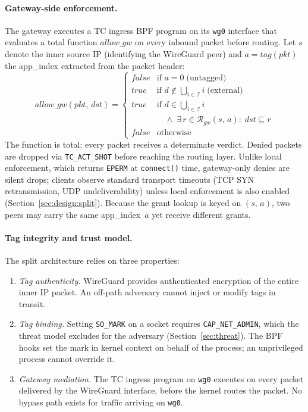 \documentclass[sigconf]{acmart}
\begin{document}
\paragraph{Gateway-side enforcement.}
The gateway executes a TC ingress BPF program on its \texttt{wg0}
interface that evaluates a total function
$\mathit{allow\_gw}$ on every inbound packet before routing.
Let $s$ denote the inner source IP (identifying the WireGuard
peer) and $a = \mathit{tag}(\mathit{pkt})$ the app\_index
extracted from the packet header:
\[
  \mathit{allow\_gw}(\mathit{pkt},\, \mathit{dst}) =
  \begin{cases}
    \mathit{false}
      & \text{if } a = 0
        \;\text{(untagged)} \\[4pt]
    \mathit{true}
      & \text{if } d \notin \bigcup_{i \in \mathcal{I}} i
        \;\text{(external)} \\[4pt]
    \mathit{true}
      & \text{if } d \in \bigcup_{i \in \mathcal{I}} i \\
      & \quad \land\; \exists\, r \in
              \mathcal{R}_{\mathit{gw}}(s,\, a)
              :\; \mathit{dst} \sqsubseteq r \\[4pt]
    \mathit{false}
      & \text{otherwise}
  \end{cases}
\]
The function is total: every packet receives a determinate
verdict.  Denied packets are dropped via \texttt{TC\_ACT\_SHOT}
before reaching the routing layer.
Unlike local enforcement, which returns \texttt{EPERM} at
\texttt{connect()} time, gateway-only denies are silent drops;
clients observe standard transport timeouts (TCP SYN
retransmission, UDP undeliverability) unless local enforcement
is also enabled (Section~\ref{sec:design:split}).
Because the grant lookup is keyed on
$(s,\, a)$, two peers may carry the same app\_index~$a$ yet
receive different grants.

\paragraph{Tag integrity and trust model.}
The split architecture relies on three properties:
\begin{enumerate}
  \item \emph{Tag authenticity.}
    WireGuard provides authenticated encryption of the entire inner IP packet.
    An off-path adversary cannot
    inject or modify tags in transit.
  \item \emph{Tag binding.}
    Setting \texttt{SO\_MARK} on a socket requires
    \texttt{CAP\_NET\_\allowbreak ADMIN}, which the threat model
    excludes for the adversary
    (Section~\ref{sec:threat}).  The BPF hooks set the mark in
    kernel context on behalf of the process; an unprivileged
    process cannot override it.
  \item \emph{Gateway mediation.}
    The TC ingress program on \texttt{wg0} executes on every
    packet delivered by the WireGuard interface, before the kernel
    routes the packet.  No bypass path exists for traffic arriving
    on \texttt{wg0}.
\end{enumerate}
\end{document}
